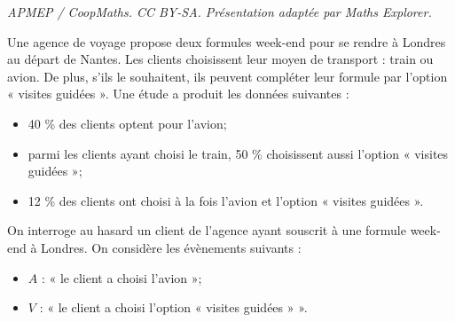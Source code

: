 \documentclass[10pt]{article}
\begin{document}
\noindent\textit{APMEP / CoopMaths. CC BY-SA. Présentation adaptée par Maths Explorer.}\par\medskip
Une agence de voyage propose deux formules week-end pour se rendre à Londres au départ de Nantes. Les clients choisissent leur moyen de transport : train ou avion. De plus, s’ils le souhaitent, ils peuvent compléter leur formule par l’option « visites guidées ». Une étude a produit les données suivantes :

\begin{itemize}
	\item 40 \% des clients optent pour l’avion;
	\item parmi les clients ayant choisi le train, 50 \% choisissent aussi l’option « visites guidées »;
	\item 12 \% des clients ont choisi à la fois l’avion et l’option « visites guidées ».
\end{itemize}

On interroge au hasard un client de l’agence ayant souscrit à une formule week-end à Londres. On considère les évènements suivants :

\begin{itemize}
	\item $A$ : « le client a choisi l’avion »;
	\item $V$ : « le client a choisi l’option « visites guidées » ».
\end{itemize}
\end{document}
